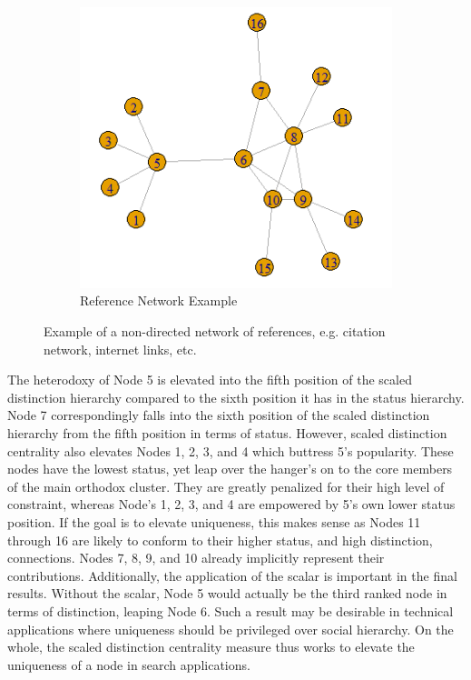 \documentclass[12pt]{article}
\begin{document}
\begin{figure}
    \captionsetup[subfigure]{font=footnotesize,labelfont=footnotesize}
    \centering
     \begin{subfigure}[b]{0.45\textwidth}
        \includegraphics[width=1.0\textwidth]{Plots/search.png}
            \caption{Reference Network Example}
            \label{fig:search}
    \end{subfigure}
    \caption{Example of a non-directed network of references, e.g. citation network, internet links, etc.}
    \label{fig:search}
\end{figure}



The heterodoxy of Node 5 is elevated into the fifth position of the scaled distinction hierarchy compared to the sixth position it has in the status hierarchy. Node 7 correspondingly falls into the sixth position of the scaled distinction hierarchy from the fifth position in terms of status. However, scaled distinction centrality also elevates Nodes 1, 2, 3, and 4 which buttress 5's popularity. These nodes have the lowest status, yet leap over the hanger's on to the core members of the main orthodox cluster. They are greatly penalized for their high level of constraint, whereas Node's 1, 2, 3, and 4 are empowered by 5's own lower status position. If the goal is to elevate uniqueness, this makes sense as Nodes 11 through 16 are likely to conform to their higher status, and high distinction, connections. Nodes 7, 8, 9, and 10 already implicitly represent their contributions. Additionally, the application of the scalar is important in the final results. Without the scalar, Node 5 would actually be the third ranked node in terms of distinction, leaping Node 6. Such a result may be desirable in technical applications where uniqueness should be privileged over social hierarchy. On the whole, the scaled distinction centrality measure thus works to elevate the uniqueness of a node in search applications.   
\end{document}
